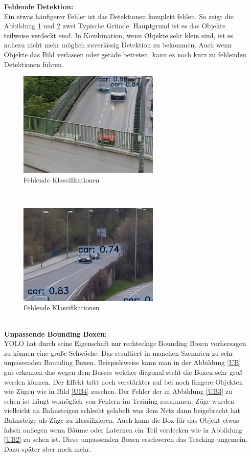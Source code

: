 \documentclass[conference]{IEEEtran}
\begin{document}
	\textbf{Fehlende Detektion:}\\
	Ein etwas häufigerer Fehler ist das Detektionen komplett fehlen. So zeigt die Abbildung \ref{FeK} und \ref{FeK2} zwei Typische Gründe. Hauptgrund ist es das Objekte teilweise verdeckt sind. In Kombination, wenn Objekte sehr klein sind, ist es nahezu nicht mehr möglich zuverlässig Detektion zu bekommen. Auch wenn Objekte das Bild verlassen oder gerade betreten, kann es noch kurz zu fehlenden Detektionen führen.
	\begin{figure}[!h]
		\begin{center}
			\includegraphics[width=7cm]{Media/Output_680 - Kopie.jpg}
			\caption{Fehlende Klassifikationen}
			\label{FeK}
		\end{center}
	\end{figure}\\
	\begin{figure}[!h]
		\begin{center}
			\includegraphics[width=7cm]{Media/Output_108 - Kopie.jpg}
			\caption{Fehlende Klassifikationen}
			\label{FeK2}
		\end{center}
	\end{figure}\\
	\textbf{Unpassende Bounding Boxen:}\\
	YOLO hat durch seine Eigenschaft nur rechteckige Bounding Boxen vorhersagen zu können eine große Schwäche. Das resultiert in manchen Szenarien zu sehr unpassenden Bounding Boxen. Beispielsweise kann man in der Abbildung \ref{UB} gut erkennen das wegen dem Busses welcher diagonal steht die Boxen sehr groß werden können. Der Effekt tritt noch verstärkter auf bei noch längere Objekten wie Zügen wie in Bild \ref{UB4} zusehen. Der Fehler der in Abbildung \ref{UB3} zu sehen ist hängt womöglich von Fehlern im Training zusammen. Züge wurden vielleicht an Bahnsteigen schlecht gelabelt was dem Netz dann beigebracht hat Bahnsteige als Züge zu klassifizieren. Auch kann die Box für das Objekt etwas falsch anliegen wenn Bäume oder Laternen ein Teil verdecken wie in Abbildung \ref{UB2} zu sehen ist. Diese unpassenden Boxen erschweren das Tracking ungemein. Dazu später aber noch mehr. 
\end{document}
